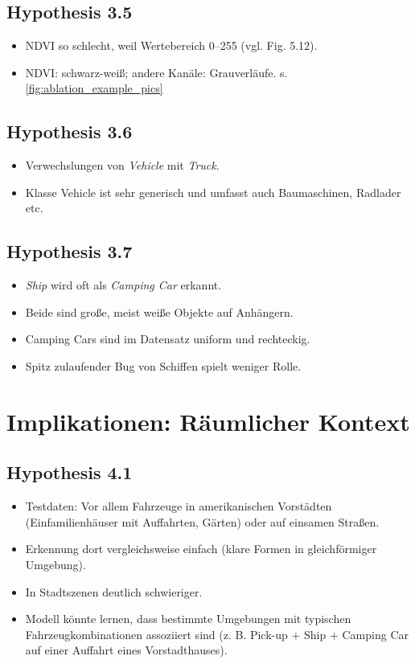 \subsection*{Hypothesis 3.5}
\begin{itemize}
  \item NDVI so schlecht, weil Wertebereich 0--255 (vgl. Fig. 5.12).
  \item NDVI: schwarz-weiß; andere Kanäle: Grauverläufe. s. \ref{fig:ablation_example_pics}
\end{itemize}

\subsection*{Hypothesis 3.6}
\begin{itemize}
  \item Verwechslungen von \emph{Vehicle} mit \emph{Truck}.
  \item Klasse Vehicle ist sehr generisch und umfasst auch Baumaschinen, Radlader etc.
\end{itemize}

\subsection*{Hypothesis 3.7}
\begin{itemize}
  \item \emph{Ship} wird oft als \emph{Camping Car} erkannt.
  \item Beide sind große, meist weiße Objekte auf Anhängern.
  \item Camping Cars sind im Datensatz uniform und rechteckig.
  \item Spitz zulaufender Bug von Schiffen spielt weniger Rolle.
\end{itemize}


\section{Implikationen: Räumlicher Kontext}

\subsection*{Hypothesis 4.1}
\begin{itemize}
  \item Testdaten: Vor allem Fahrzeuge in amerikanischen Vorstädten (Einfamilienhäuser mit Auffahrten, Gärten) oder auf einsamen Straßen.
  \item Erkennung dort vergleichsweise einfach (klare Formen in gleichförmiger Umgebung).
  \item In Stadtszenen deutlich schwieriger.
  \item Modell könnte lernen, dass bestimmte Umgebungen mit typischen Fahrzeugkombinationen assoziiert sind (z. B. Pick-up + Ship + Camping Car auf einer Auffahrt eines Vorstadthauses).
\end{itemize}

